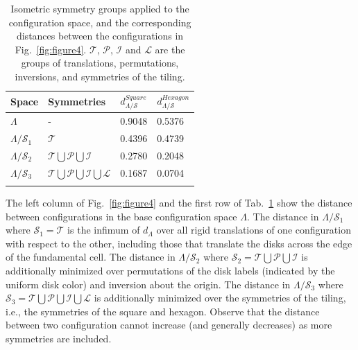 \documentclass[default,iicol]{sn-jnl}%
\theoremstyle{thmstyleone}%
\theoremstyle{thmstyletwo}%
\theoremstyle{thmstylethree}%
\begin{document}
\begin{table}[h]
	\begin{center}
		\begin{minipage}{174pt}
			\caption{\label{table:symmetries}Isometric symmetry groups applied to the configuration space, and the corresponding distances between the configurations in Fig.\ \ref{fig:figure4}. $\mathcal{T}$, $\mathcal{P}$, $\mathcal{I}$ and $\mathcal{L}$ are the groups of translations, permutations, inversions, and symmetries of the tiling.}
			\begin{tabular}{@{}llll@{}}
				\toprule
				Space&Symmetries&$d_{\Lambda/\mathcal{S}}^{Square}$&$d_{\Lambda/\mathcal{S}}^{Hexagon}$\\
				\midrule
				$\Lambda$               & -             & 0.9048 & 0.5376 \\ 
				$\Lambda/\mathcal{S}_1$ & $\mathcal{T}$  & 0.4396 & 0.4739\\ 
				$\Lambda/\mathcal{S}_2$ & $\mathcal{T} \bigcup \mathcal{P} \bigcup \mathcal{I}$ & 0.2780 & 0.2048\\
				$\Lambda/\mathcal{S}_3$ & $\mathcal{T} \bigcup \mathcal{P} \bigcup \mathcal{I} \bigcup \mathcal{L}$ & 0.1687 & 0.0704\\
				\botrule
			\end{tabular}
		\end{minipage}
	\end{center}
\end{table}

The left column of Fig.\ \ref{fig:figure4} and the first row of Tab.\ \ref{table:symmetries} show the distance between configurations in the base configuration space $\Lambda$. The distance in $\Lambda/\mathcal{S}_1$ where $\mathcal{S}_1 = \mathcal{T}$ is the infimum of $d_\Lambda$ over all rigid translations of one configuration with respect to the other, including those that translate the disks across the edge of the fundamental cell. The distance in $\Lambda/\mathcal{S}_2$ where $\mathcal{S}_2 = \mathcal{T} \bigcup \mathcal{P} \bigcup \mathcal{I}$ is additionally minimized over permutations of the disk labels (indicated by the uniform disk color) and inversion about the origin. The distance in $\Lambda/\mathcal{S}_3$ where $\mathcal{S}_3 = \mathcal{T} \bigcup \mathcal{P} \bigcup \mathcal{I} \bigcup \mathcal{L}$ is additionally minimized over the symmetries of the tiling, i.e., the symmetries of the square and hexagon. Observe that the distance between two configuration cannot increase (and generally decreases) as more symmetries are included.
\end{document}
